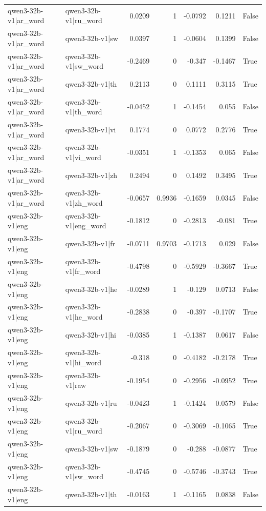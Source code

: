 \begin{table}
\begin{tabular}{l l r r r r l}
qwen3-32b-v1|ar_word & qwen3-32b-v1|ru_word & 0.0209 & 1 & -0.0792 & 0.1211 & False \\
qwen3-32b-v1|ar_word & qwen3-32b-v1|sw & 0.0397 & 1 & -0.0604 & 0.1399 & False \\
qwen3-32b-v1|ar_word & qwen3-32b-v1|sw_word & -0.2469 & 0 & -0.347 & -0.1467 & True \\
qwen3-32b-v1|ar_word & qwen3-32b-v1|th & 0.2113 & 0 & 0.1111 & 0.3115 & True \\
qwen3-32b-v1|ar_word & qwen3-32b-v1|th_word & -0.0452 & 1 & -0.1454 & 0.055 & False \\
qwen3-32b-v1|ar_word & qwen3-32b-v1|vi & 0.1774 & 0 & 0.0772 & 0.2776 & True \\
qwen3-32b-v1|ar_word & qwen3-32b-v1|vi_word & -0.0351 & 1 & -0.1353 & 0.065 & False \\
qwen3-32b-v1|ar_word & qwen3-32b-v1|zh & 0.2494 & 0 & 0.1492 & 0.3495 & True \\
qwen3-32b-v1|ar_word & qwen3-32b-v1|zh_word & -0.0657 & 0.9936 & -0.1659 & 0.0345 & False \\
qwen3-32b-v1|eng & qwen3-32b-v1|eng_word & -0.1812 & 0 & -0.2813 & -0.081 & True \\
qwen3-32b-v1|eng & qwen3-32b-v1|fr & -0.0711 & 0.9703 & -0.1713 & 0.029 & False \\
qwen3-32b-v1|eng & qwen3-32b-v1|fr_word & -0.4798 & 0 & -0.5929 & -0.3667 & True \\
qwen3-32b-v1|eng & qwen3-32b-v1|he & -0.0289 & 1 & -0.129 & 0.0713 & False \\
qwen3-32b-v1|eng & qwen3-32b-v1|he_word & -0.2838 & 0 & -0.397 & -0.1707 & True \\
qwen3-32b-v1|eng & qwen3-32b-v1|hi & -0.0385 & 1 & -0.1387 & 0.0617 & False \\
qwen3-32b-v1|eng & qwen3-32b-v1|hi_word & -0.318 & 0 & -0.4182 & -0.2178 & True \\
qwen3-32b-v1|eng & qwen3-32b-v1|raw & -0.1954 & 0 & -0.2956 & -0.0952 & True \\
qwen3-32b-v1|eng & qwen3-32b-v1|ru & -0.0423 & 1 & -0.1424 & 0.0579 & False \\
qwen3-32b-v1|eng & qwen3-32b-v1|ru_word & -0.2067 & 0 & -0.3069 & -0.1065 & True \\
qwen3-32b-v1|eng & qwen3-32b-v1|sw & -0.1879 & 0 & -0.288 & -0.0877 & True \\
qwen3-32b-v1|eng & qwen3-32b-v1|sw_word & -0.4745 & 0 & -0.5746 & -0.3743 & True \\
qwen3-32b-v1|eng & qwen3-32b-v1|th & -0.0163 & 1 & -0.1165 & 0.0838 & False \\

\end{tabular}
\end{table}
